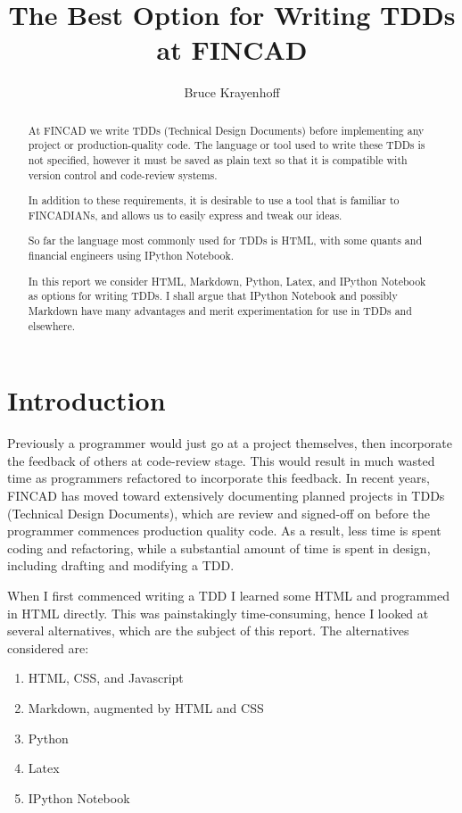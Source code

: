 \documentclass[12pt]{Report}
\title{The Best Option for Writing TDDs at FINCAD}
\author{Bruce Krayenhoff}
\begin{document}
\maketitle

\begin{abstract}
At FINCAD we write TDDs (Technical Design Documents) before implementing any project or production-quality code.  
The language or tool used to write these TDDs is not specified, however it must be saved as plain text so that it is 
compatible with version control and code-review systems.

In addition to these requirements, it is desirable to use a tool that is familiar to FINCADIANs, and allows us to easily express and tweak our ideas.

So far the language most commonly used for TDDs is HTML, with some quants and financial engineers using IPython Notebook.

In this report we consider HTML, Markdown, Python, Latex, and IPython Notebook as options for writing TDDs.  
I shall argue that IPython Notebook and possibly Markdown have many advantages and merit experimentation for use in TDDs and elsewhere.
\end{abstract}

\section{Introduction}
Previously a programmer would just go at a project themselves, then incorporate the feedback of others at code-review stage.  
This would result in much wasted time as programmers refactored to incorporate this feedback. 
In recent years, FINCAD has moved toward extensively documenting planned projects in TDDs (Technical Design Documents), 
which are review and signed-off on before the programmer commences production quality code.  
As a result, less time is spent coding and refactoring, while a substantial amount of time is spent in design, including drafting and modifying a TDD.

When I first commenced writing a TDD I learned some HTML and programmed in HTML directly. 
This was painstakingly time-consuming, hence I looked at several alternatives, which are the subject of this report.  
The alternatives considered are:

\begin{enumerate}
	\item HTML, CSS, and Javascript
	\item Markdown, augmented by HTML and CSS
	\item Python
	\item Latex
	\item IPython Notebook
\end{enumerate}
\end{document}
